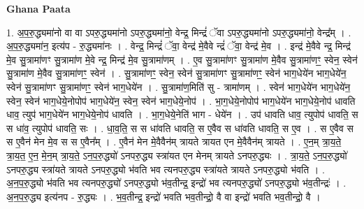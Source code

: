 \documentclass[17pt]{extarticle}
\begin{document}
\textbf{Ghana Paata } \newline

1. अ॒प॒रु॒द्ध्यमा॑नो वा वा ऽपरु॒द्ध्यमा॑नो ऽपरु॒द्ध्यमा॑नो॒ वेन्द्र॒ मिन्द्रं॑ ॅवा ऽपरु॒द्ध्यमा॑नो ऽपरु॒द्ध्यमा॑नो॒ वेन्द्र᳚म् । . अ॒प॒रु॒द्ध्यमा॑न॒ इत्य॑प - रु॒द्ध्यमा॑नः । . वेन्द्र॒ मिन्द्रं॑ ॅवा॒ वेन्द्र॑ मे॒वैवे न्द्रं॑ ॅवा॒ वेन्द्र॑ मे॒व । . इन्द्र॑ मे॒वैवे न्द्र॒ मिन्द्र॑ मे॒व सु॒त्रामा॑णꣳ सु॒त्रामा॑ण मे॒वे न्द्र॒ मिन्द्र॑ मे॒व सु॒त्रामा॑णम् । . ए॒व सु॒त्रामा॑णꣳ सु॒त्रामा॑ण मे॒वैव सु॒त्रामा॑णꣳ॒॒ स्वेन॒ स्वेन॑ सु॒त्रामा॑ण मे॒वैव सु॒त्रामा॑णꣳ॒॒ स्वेन॑ । . सु॒त्रामा॑णꣳ॒॒ स्वेन॒ स्वेन॑ सु॒त्रामा॑णꣳ सु॒त्रामा॑णꣳ॒॒ स्वेन॑ भाग॒धेये॑न भाग॒धेये॑न॒ स्वेन॑ सु॒त्रामा॑णꣳ सु॒त्रामा॑णꣳ॒॒ स्वेन॑ भाग॒धेये॑न । . सु॒त्रामा॑ण॒मिति॑ सु - त्रामा॑णम् । . स्वेन॑ भाग॒धेये॑न भाग॒धेये॑न॒ स्वेन॒ स्वेन॑ भाग॒धेये॒नोपोप॑ भाग॒धेये॑न॒ स्वेन॒ स्वेन॑ भाग॒धेये॒नोप॑ । . भा॒ग॒धेये॒नोपोप॑ भाग॒धेये॑न भाग॒धेये॒नोप॑ धावति धाव॒ त्युप॑ भाग॒धेये॑न भाग॒धेये॒नोप॑ धावति । . भा॒ग॒धेये॒नेति॑ भाग - धेये॑न । . उप॑ धावति धाव॒ त्युपोप॑ धावति॒ स स धा॑व॒ त्युपोप॑ धावति॒ सः । . धा॒व॒ति॒ स स धा॑वति धावति॒ स ए॒वैव स धा॑वति धावति॒ स ए॒व । . स ए॒वैव स स ए॒वैन॑ मेन मे॒व स स ए॒वैन᳚म् । . ए॒वैन॑ मेन मे॒वैवैन॑म् त्रायते त्रायत एन मे॒वैवैन॑म् त्रायते । . ए॒न॒म् त्रा॒य॒ते॒ त्रा॒य॒त॒ ए॒न॒ मे॒न॒म् त्रा॒य॒ते॒ ऽन॒प॒रु॒द्ध्यो॑ ऽनपरु॒द्ध्य स्त्रा॑यत एन मेनम् त्रायते ऽनपरु॒द्ध्यः । . त्रा॒य॒ते॒ ऽन॒प॒रु॒द्ध्यो॑ ऽनपरु॒द्ध्य स्त्रा॑यते त्रायते ऽनपरु॒द्ध्यो भ॑वति भव त्यनपरु॒द्ध्य स्त्रा॑यते त्रायते ऽनपरु॒द्ध्यो भ॑वति । . अ॒न॒प॒रु॒द्ध्यो भ॑वति भव त्यनपरु॒द्ध्यो॑ ऽनपरु॒द्ध्यो भ॑व॒तीन्द्र॒ इन्द्रो॑ भव त्यनपरु॒द्ध्यो॑ ऽनपरु॒द्ध्यो भ॑व॒तीन्द्रः॑ । . अ॒न॒प॒रु॒द्ध्य इत्य॑नप - रु॒द्ध्यः । . भ॒व॒तीन्द्र॒ इन्द्रो॑ भवति भव॒तीन्द्रो॒ वै वा इन्द्रो॑ भवति भव॒तीन्द्रो॒ वै । \newline
\end{document}
